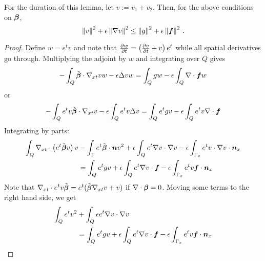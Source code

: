 \documentclass{article}
\begin{document}
\begin{lemma}
\label{lem:l2}
For the duration of this lemma, let $v:=v_1+v_2$.
Then, for the above conditions on $\boldsymbol\beta$,
\[
\left\| v \right\|^2+\epsilon\left\| \nabla v \right\|^2\leq\left\| g \right\|^2+\epsilon\left\| \boldsymbol f \right\|^2\,.
\]
\end{lemma}
\begin{proof}
Define $w=e^{t}v$ and note that $\frac{\partial w}{\partial t}=\left( \frac{\partial v}{\partial t}+v \right)e^{t}$ while
all spatial derivatives go through.
Multiplying the adjoint by $w$ and integrating over $Q$ gives
\begin{align*}
-\int_Q\tilde{\boldsymbol\beta}\cdot\nabla_{xt} vw-\epsilon\Delta vw=\int_Qgw-\epsilon\int_Q\nabla\cdot\boldsymbol f w
\end{align*}
or
\begin{align*}
-\int_Qe^{t}v\tilde{\boldsymbol\beta}\cdot\nabla_{xt} v-\epsilon\int_Q e^{t}v\Delta v=\int_Qe^{t}gv-\epsilon\int_Qe^{t}v\nabla\cdot\boldsymbol f
\end{align*}
Integrating by parts:
\begin{align*}
\int_Q\nabla_{xt}\cdot\left( e^{t}\tilde{\boldsymbol\beta} v \right)v&
-\int_\Gamma e^{t}\tilde{\boldsymbol\beta}\cdot\boldsymbol n v^2
+\epsilon\int_Qe^{t}\nabla v\cdot\nabla v
-\epsilon\int_{\Gamma_x}e^{t}v\cdot\nabla v\cdot\boldsymbol n_x
\\
&=
\int_Qe^{t}gv
+\epsilon\int_Qe^{t}\nabla v\cdot\boldsymbol f
-\epsilon\int_{\Gamma_x}e^{t}v\boldsymbol f\cdot\boldsymbol n_x
\end{align*}
Note that $\nabla_{xt}\cdot{e^{t}v\tilde{\boldsymbol\beta}}=e^{t}(\tilde{\boldsymbol\beta}\nabla_{xt} v+v)$ if $\nabla\cdot\boldsymbol\beta=0$.
Moving some terms to the right hand side, we get
\begin{align*}
\int_Q e^{t}v^2
&+\int_Q\epsilon e^{t}\Grad v\cdot\Grad v
\\
&=
\int_Qe^{t}gv
+\epsilon\int_Qe^{t}\Grad v\cdot\bff
-\epsilon\int_{\Gamma_x}e^{t}v\bff\cdot\bfn_x\\

\end{align*}
\end{proof}
\end{document}
